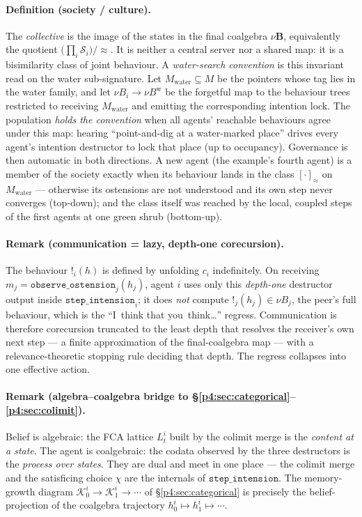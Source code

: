 \documentclass{article}
\newcommand{\method}[1]{\texttt{#1}}
\begin{document}
\paragraph{Definition (society / culture).}
The \emph{collective} is the image of the states in the final coalgebra
$\nu\mathbf{B}$, equivalently the quotient $\big(\prod_i\mathcal{S}_i\big)/\!\approx$.
It is neither a central server nor a shared map: it is a bisimilarity class of
joint behaviour. A \emph{water-search convention} is this invariant read on
the water sub-signature. Let $M_{\mathrm{water}}\subseteq M$ be the pointers
whose tag lies in the water family, and let
$\nu B_i\to\nu B^{\mathrm{w}}$ be the forgetful map to the behaviour trees
restricted to receiving $M_{\mathrm{water}}$ and emitting the corresponding
intention lock. The population \emph{holds the convention} when all agents'
reachable behaviours agree under this map: hearing ``point-and-dig at a
water-marked place'' drives every agent's intention destructor to lock that
place (up to occupancy). Governance is then automatic in both directions. A
new agent (the example's fourth agent) is a member of the society exactly
when its behaviour lands in the class $[\cdot]_{\approx}$ on
$M_{\mathrm{water}}$ --- otherwise its ostensions are not understood and its
own step never converges (top-down); and the class itself was reached by the
local, coupled steps of the first agents at one green shrub (bottom-up).

\paragraph{Remark (communication = lazy, depth-one corecursion).}
The behaviour $!_i(h)$ is defined by unfolding $c_i$ indefinitely. On
receiving $m_j=\method{observe\_ostension}_j(h_j)$, agent $i$ uses only this
\emph{depth-one} destructor output inside $\method{step\_intension}_i$; it
does \emph{not} compute $!_j(h_j)\in\nu B_j$, the peer's full behaviour, which
is the ``I~think that you~think\ldots'' regress. Communication is therefore
corecursion truncated to the least depth that resolves the receiver's own
next step --- a finite approximation of the final-coalgebra map --- with a
relevance-theoretic stopping rule \citep{sperber1995relevance} deciding that depth. The
regress collapses into one effective action.

\paragraph{Remark (algebra--coalgebra bridge to \S\ref{p4:sec:categorical}--\ref{p4:sec:colimit}).}
Belief is algebraic: the FCA lattice $L_t^i$ built by the colimit merge is
the \emph{content at a state}. The agent is coalgebraic: the codata observed
by the three destructors is the \emph{process over states}. They are dual and
meet in one place --- the colimit merge and the satisficing choice $\chi$ are
the internals of $\method{step\_intension}$. The memory-growth diagram
$\mathcal{K}_0^i\to\mathcal{K}_1^i\to\cdots$ of \S\ref{p4:sec:categorical} is
precisely the belief-projection of the coalgebra trajectory
$h_0^i\mapsto h_1^i\mapsto\cdots$.
\end{document}
